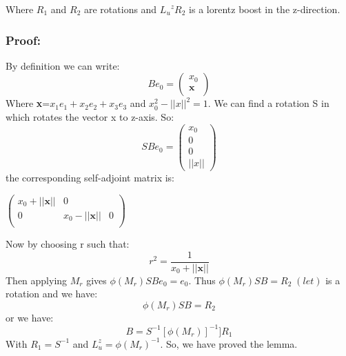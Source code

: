 Where $R_1$ and $R_2$ are rotations and  ${L_u}^zR_2$ is a lorentz boost in the z-direction.

\subsubsection{Proof:}
By definition we can write:
\begin{equation}
    Be_0=
    {
    \begin{pmatrix}
      x_0\\
      \textbf{x}\\
    \end{pmatrix}
    }
\end{equation}
Where \textbf{x}=$x_1e_1+x_2e_2+x_3e_3$ and $x_0^2-||x||^2=1$. We can find a rotation S in which rotates the vector x to z-axis. So:
\begin{equation}
    SBe_0=
    {
    \begin{pmatrix}
      x_0\\
      0\\
      0\\
      ||x||
    \end{pmatrix}
    }
\end{equation}
the corresponding self-adjoint matrix is:
\begin{center}
$\begin{pmatrix}
  x_0+||\textbf{x}||&0\\
  0&x_0-||\textbf{x}||&0\\
\end{pmatrix}$
\end{center}

Now by choosing r such that:
\begin{equation}
    r^2=\frac{1}{x_0+||\textbf{x}||}
\end{equation}
Then applying $M_r$ gives $\phi(M_r)SBe_0=e_0$. Thus $\phi(M_r)SB=R_2 \;(let)$ is a rotation and we have:
\begin{equation}
    \phi(M_r)SB=R_2
\end{equation}
or we have:
\begin{equation}
    B=S^{-1}[\phi(M_r)]^{-1}] R_1
\end{equation}
With $R_1=S^{-1}$ and $L_{u}^{z}=\phi(M_r)^{-1}$.
So, we have proved the lemma.